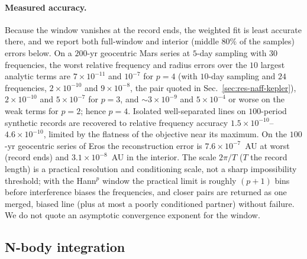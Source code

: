 \paragraph*{Measured accuracy.} Because the window vanishes at the record ends,
the weighted fit is least accurate there, and we report both full-window and
interior (middle $80\%$ of the samples) errors below. On a $200$-yr geocentric
Mars series at $5$-day sampling with $30$ frequencies, the worst relative
frequency and radius errors over the $10$ largest analytic terms are
$7\times10^{-11}$ and $10^{-7}$ for $p=4$ (with $10$-day sampling and $24$ frequencies, $2\times10^{-10}$ and $9\times10^{-8}$, the pair quoted in Sec.~\ref{sec:res-naff-kepler}), $2\times10^{-10}$ and
$5\times10^{-7}$ for $p=3$, and $\sim3\times10^{-9}$ and $5\times10^{-4}$ or
worse on the weak terms for $p=2$; hence $p=4$. Isolated well-separated lines
on $100$-period synthetic records are recovered to relative frequency accuracy
$1.5\times10^{-10}$--$4.6\times10^{-10}$, limited by the flatness of the
objective near its maximum. On the $100$-yr geocentric series of Eros the
reconstruction error is $7.6\times10^{-7}$~AU at worst (record ends) and
$3.1\times10^{-8}$~AU in the interior. The scale $2\pi/T$ ($T$ the record length) is a
practical resolution and conditioning scale, not a sharp impossibility threshold;
with the Hann$^p$ window the
practical limit is roughly $(p+1)$ bins before interference biases the
frequencies, and closer pairs are returned as one merged, biased line (plus at
most a poorly conditioned partner) without failure. We do not quote an
asymptotic convergence exponent for the window.

\subsection{N-body integration}
\label{sec:num-nbody}

